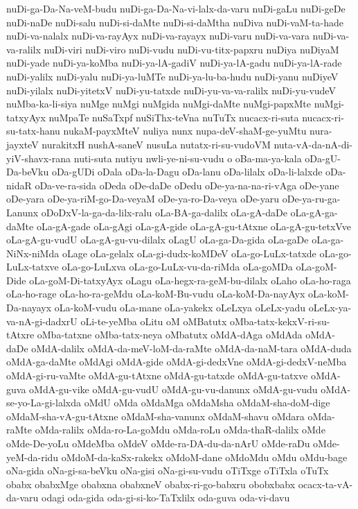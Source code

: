 {nuDi-ga-Da-Na-veM-budu
nuDi-ga-Da-Na-vi-lalx-da-varu
nuDi-gaLu
nuDi-geDe
nuDi-naDe
nuDi-salu
nuDi-si-daMte
nuDi-si-daMtha
nuDiva
nuDi-vaM-ta-hade
nuDi-va-nalalx
nuDi-va-rayAyx
nuDi-va-rayayx
nuDi-varu
nuDi-va-vara
nuDi-va-va-ralilx
nuDi-viri
nuDi-viro
nuDi-vudu
nuDi-vu-titx-papxru
nuDiya
nuDiyaM
nuDi-yade
nuDi-ya-koMba
nuDi-ya-lA-gadiV
nuDi-ya-lA-gadu
nuDi-ya-lA-rade
nuDi-yalilx
nuDi-yalu
nuDi-ya-luMTe
nuDi-ya-lu-ba-hudu
nuDi-yanu
nuDiyeV
nuDi-yilalx
nuDi-yitetxV
nuDi-yu-tatxde
nuDi-yu-va-va-ralilx
nuDi-yu-vudeV
nuMba-ka-li-siya
nuMge
nuMgi
nuMgida
nuMgi-daMte
nuMgi-papxMte
nuMgi-tatxyAyx
nuMpaTe
nuSaTxpf
nuSiThx-teVna
nuTuTx
nucacx-ri-suta
nucacx-ri-su-tatx-hanu
nukaM-payxMteV
nuliya
nunx
nupa-deV-shaM-ge-yuMtu
nura-jayxteV
nurakitxH
nushA-saneV
nusuLa
nutatx-ri-su-vudoVM
nuta-vA-da-nA-di-yiV-shavx-rana
nuti-suta
nutiyu
nwli-ye-ni-su-vudu
o
oBa-ma-ya-kala
oDa-gU-Da-beVku
oDa-gUDi
oDala
oDa-la-Dagu
oDa-lanu
oDa-lilalx
oDa-li-lalxde
oDa-nidaR
oDa-ve-ra-sida
oDeda
oDe-daDe
oDedu
oDe-ya-na-na-ri-vAga
oDe-yane
oDe-yara
oDe-ya-riM-go-Da-veyaM
oDe-ya-ro-Da-veya
oDe-yaru
oDe-ya-ru-ga-Lanunx
oDoDxV-la-ga-da-lilx-ralu
oLa-BA-ga-dalilx
oLa-gA-daDe
oLa-gA-ga-daMte
oLa-gA-gade
oLa-gAgi
oLa-gA-gide
oLa-gA-gu-tAtxne
oLa-gA-gu-tetxVve
oLa-gA-gu-vudU
oLa-gA-gu-vu-dilalx
oLagU
oLa-ga-Da-gida
oLa-gaDe
oLa-ga-NiNx-niMda
oLage
oLa-gelalx
oLa-gi-dudx-koMDeV
oLa-go-LuLx-tatxde
oLa-go-LuLx-tatxve
oLa-go-LuLxva
oLa-go-LuLx-vu-da-riMda
oLa-goMDa
oLa-goM-Dide
oLa-goM-Di-tatxyAyx
oLagu
oLa-hegx-ra-geM-bu-dilalx
oLaho
oLa-ho-raga
oLa-ho-rage
oLa-ho-ra-geMdu
oLa-koM-Bu-vudu
oLa-koM-Da-nayAyx
oLa-koM-Da-nayayx
oLa-koM-vudu
oLa-mane
oLa-yakekx
oLeLxya
oLeLx-yadu
oLeLx-ya-va-nA-gi-dadxrU
oLi-te-yeMba
oLitu
oM
oMBatutx
oMba-tatx-kekxV-ri-su-tAtxre
oMba-tatxne
oMba-tatx-neya
oMbatutx
oMdA-dAga
oMdAda
oMdA-daDe
oMdA-dalilx
oMdA-da-meV-loM-da-raMte
oMdA-da-naM-tara
oMdA-duda
oMdA-ga-daMte
oMdAgi
oMdA-gide
oMdA-gi-dedxVne
oMdA-gi-dedxV-neMba
oMdA-gi-ru-vaMte
oMdA-gu-tAtxne
oMdA-gu-tatxde
oMdA-gu-tatxve
oMdA-guva
oMdA-gu-vike
oMdA-gu-vudU
oMdA-gu-vu-danunx
oMdA-gu-vudu
oMdA-se-yo-La-gi-lalxda
oMdU
oMda
oMdaMga
oMdaMsha
oMdaM-sha-doM-dige
oMdaM-sha-vA-gu-tAtxne
oMdaM-sha-vanunx
oMdaM-shavu
oMdara
oMda-raMte
oMda-ralilx
oMda-ro-La-goMdu
oMda-roLu
oMda-thaR-dalilx
oMde
oMde-De-yoLu
oMdeMba
oMdeV
oMde-ra-DA-du-da-nArU
oMde-raDu
oMde-yeM-da-ridu
oMdoM-da-kaSx-rakekx
oMdoM-dane
oMdoMdu
oMdu
oMdu-bage
oNa-gida
oNa-gi-sa-beVku
oNa-gisi
oNa-gi-su-vudu
oTiTxge
oTiTxla
oTuTx
obabx
obabxMge
obabxna
obabxneV
obabx-ri-go-babxru
obobxbabx
ocacx-ta-vA-da-varu
odagi
oda-gida
oda-gi-si-ko-TaTxlilx
oda-guva
oda-vi-davu
}
